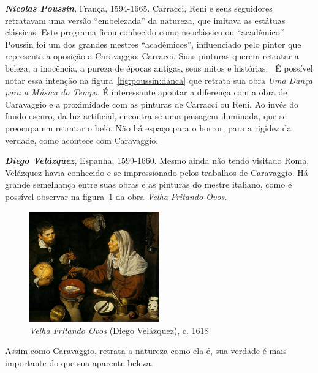 \textbf{\emph{Nicolas Poussin}}, França, 1594-1665. Carracci, Reni e
seus seguidores retratavam uma versão ``embelezada'' da natureza, que
imitava as estátuas clássicas. Este programa ficou conhecido como
neoclássico ou ``acadêmico.''~\cite{gombrich} Poussin foi um dos
grandes mestres ``acadêmicos'', influenciado pelo pintor que
representa a oposição a Caravaggio: Carracci. Suas pinturas querem
retratar a beleza, a inocência, a pureza de épocas antigas, seus mitos
e histórias.~\cite{unglaub} É possível notar essa intenção na
figura~\ref{fig:poussin:danca} que retrata sua obra \textit{Uma Dança
para a Música do Tempo}. É interessante apontar a diferença com a obra
de Caravaggio e a proximidade com as pinturas de Carracci ou Reni. Ao
invés do fundo escuro, da luz artificial, encontra-se uma paisagem
iluminada, que se preocupa em retratar o belo. Não há espaço para o
horror, para a rigidez da verdade, como acontece com Caravaggio.


\textbf{\emph{Diego Velázquez}}, Espanha, 1599-1660. Mesmo ainda não tendo
visitado Roma, Velázquez havia conhecido e se impressionado pelos trabalhos de
Caravaggio. Há grande semelhança entre suas obras e as pinturas do mestre
italiano, como é possível observar na figura~\ref{fig:velazquez:velha} da obra
\textit{Velha Fritando Ovos}.

\begin{figure}
  \begin{centering}
    \caption{\emph{Velha Fritando Ovos} (Diego Velázquez), c. 1618}
    \label{fig:velazquez:velha}
    \includegraphics[width=0.5\textwidth]{figs/velazquez_velha.png}
  \end{centering}
\end{figure}

Assim como Caravaggio, retrata a natureza como ela é, sua verdade é
mais importante do que sua aparente beleza.

